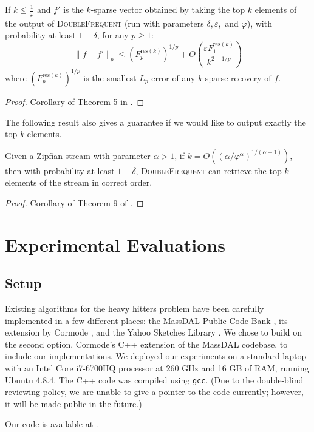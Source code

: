 \documentclass[sigconf,review=true,anonymous=true,screen]{acmart}
\newcommand{\eps}{\varepsilon}
\begin{document}
\begin{theorem}If $k \leq \frac1\varphi$ and $f'$ is the $k$-sparse vector obtained by taking the top $k$ elements of the output
of \textsc{DoubleFrequent} (run with parameters $\delta, \eps, $ and $\varphi$), with probability at least $1 - \delta$, for any $p \geq 1$:
$$\|f - f'\|_p \leq (F_p^{\text{res}(k)})^{1/p} + O\left(\frac{\eps F_1^{\text{res}(k)}}{k^{2-1/p}}\right)$$
where $(F^{\text{res}(k)}_p)^{1/p}$ is the smallest $L_p$ error of any $k$-sparse recovery of $f$.
\end{theorem}
\begin{proof} Corollary of Theorem 5 in \cite{BCIS}.
\end{proof}
The following result also gives a guarantee if we
would like to output exactly the top $k$ elements.
\begin{theorem}
Given a Zipfian stream with parameter $\alpha > 1$, if $k = O((\alpha/\varphi^\alpha)^{1/(\alpha+1)})$, then with probability at least 
$1-\delta$, \textsc{DoubleFrequent} can retrieve the
top-$k$ elements of the stream in correct order.
\end{theorem}
\begin{proof}
Corollary of Theorem 9 of \cite{BCIS}.
\end{proof}

\section{Experimental Evaluations}

\subsection{Setup}
Existing algorithms for the heavy hitters problem have been carefully implemented in a few different places:
the MassDAL Public Code Bank \cite{massdal}, its extension by Cormode \cite{corimpl}, and the Yahoo Sketches Library \cite{yahoolib}.
We chose to build on the second option, Cormode's C++ extension of the MassDAL codebase, to include our implementations. We deployed our experiments on a standard
laptop with an Intel Core i7-6700HQ processor at 260 GHz and 16 GB of RAM, running Ubuntu 4.8.4. The C++ code was compiled using \texttt{gcc}.
({Due to the double-blind reviewing policy, we are unable to give a pointer to the code currently; however, it will be made public in the future.})
\begin{anonsuppress}
Our code is available at \cite{ourgit}.
\end{anonsuppress}
\end{document}
